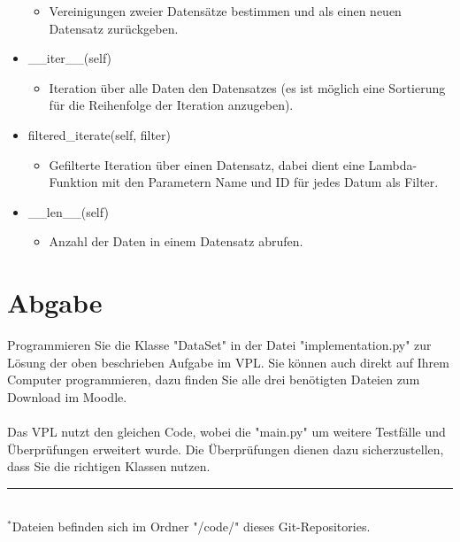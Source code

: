 \documentclass[a4paper,11pt]{article}
\begin{document}
\begin{itemize}[noitemsep,topsep=0pt]
    \begin{itemize}[noitemsep,topsep=0pt]
        \item[] Vereinigungen zweier Datensätze bestimmen und als einen neuen Datensatz zurückgeben.
    \end{itemize}
    \item \_\_iter\_\_(self)
    \begin{itemize}[noitemsep,topsep=0pt]
        \item[] Iteration über alle Daten den Datensatzes (es ist möglich eine Sortierung für die Reihenfolge der Iteration anzugeben).
    \end{itemize}
    \item filtered\_iterate(self, filter)
    \begin{itemize}[noitemsep,topsep=0pt]
        \item[] Gefilterte Iteration über einen Datensatz, dabei dient eine Lambda-Funktion mit den Parametern Name und ID für jedes Datum als Filter.
    \end{itemize}
    \item \_\_len\_\_(self)
    \begin{itemize}[noitemsep,topsep=0pt]
        \item[] Anzahl der Daten in einem Datensatz abrufen.
    \end{itemize}
\end{itemize}

\section{Abgabe}
Programmieren Sie die Klasse "DataSet" in der Datei "implementation.py" zur Lösung der oben beschrieben Aufgabe im VPL. Sie können auch direkt auf Ihrem Computer programmieren, dazu finden Sie alle drei benötigten Dateien zum Download im Moodle.\\
\\
Das VPL nutzt den gleichen Code, wobei die "main.py" um weitere Testfälle und Überprüfungen erweitert wurde.
Die Überprüfungen dienen dazu sicherzustellen, dass Sie die richtigen Klassen nutzen.\\

\hrule\hfill\\[0.2cm]
$^*$Dateien befinden sich im Ordner "/code/" dieses Git-Repositories.\\
\end{document}
